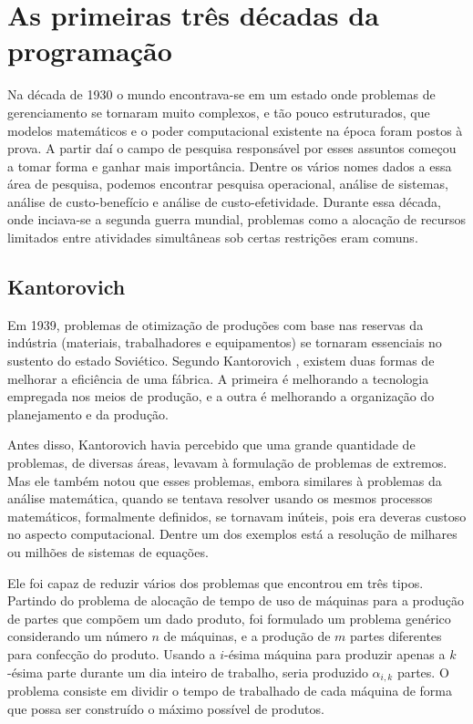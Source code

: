 
\section{As primeiras três décadas da programação}

Na década de 1930 o mundo encontrava-se em um estado onde problemas de gerenciamento
se tornaram muito complexos, e tão pouco estruturados, que modelos matemáticos e o poder
computacional existente na época foram postos à prova. A partir daí o campo de
pesquisa responsável por esses assuntos começou a tomar forma e ganhar mais importância.
Dentre os vários nomes dados a essa área de pesquisa, podemos encontrar pesquisa operacional,
análise de sistemas, análise de custo-benefício e análise de custo-efetividade. Durante essa
década, onde inciava-se a segunda guerra mundial, problemas como a alocação de recursos
limitados entre atividades simultâneas sob certas restrições eram comuns.


\subsection{Kantorovich}

Em 1939, problemas de otimização de produções com base nas reservas da indústria (materiais,
trabalhadores e equipamentos) se tornaram essenciais no sustento do estado Soviético.
Segundo Kantorovich \cite{kantorovich1939}, existem duas formas de melhorar a eficiência
de uma fábrica. A primeira é melhorando a tecnologia empregada nos meios de produção, e a
outra é melhorando a organização do planejamento e da produção.

Antes disso, Kantorovich havia percebido que uma grande quantidade de problemas, de diversas
áreas, levavam à formulação de problemas de extremos. Mas ele também notou que esses problemas,
embora similares à problemas da análise matemática, quando se tentava resolver
usando os mesmos processos matemáticos, formalmente definidos, se tornavam inúteis, pois era
deveras custoso no aspecto computacional. Dentre um dos exemplos está a resolução de milhares
ou milhões de sistemas de equações.

Ele foi capaz de reduzir vários dos problemas que encontrou em três tipos.
Partindo do problema de alocação de tempo de uso de máquinas para a produção de partes que compõem
um dado produto, foi formulado um problema genérico considerando um número
\(n\) de máquinas, e a produção de \(m\) partes diferentes para confecção do produto. Usando
a \(i\)-ésima máquina para produzir apenas a \(k\)-ésima parte durante um dia inteiro de trabalho,
seria produzido \(\alpha_{i, k}\) partes. O problema consiste em dividir o tempo de trabalhado de cada
máquina de forma que possa ser construído o máximo possível de produtos.


